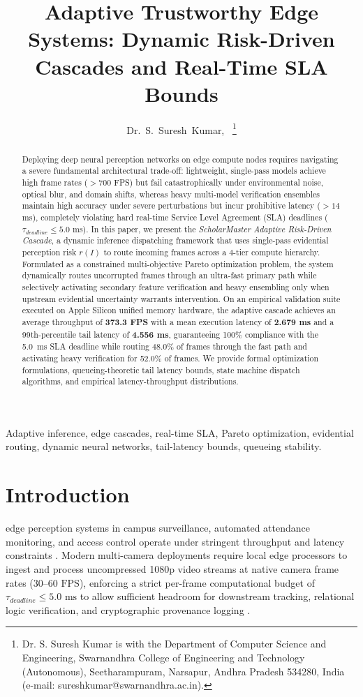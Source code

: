 \documentclass[10pt,journal,compsoc]{IEEEtran}
\title{Adaptive Trustworthy Edge Systems: Dynamic Risk-Driven Cascades and Real-Time SLA Bounds}
\author{Dr.~S.~Suresh~Kumar\IEEEauthorrefmark{1},~\IEEEmembership{Senior Member,~IEEE}
\thanks{\IEEEauthorrefmark{1}Dr. S. Suresh Kumar is with the Department of Computer Science and Engineering, Swarnandhra College of Engineering and Technology (Autonomous), Seetharampuram, Narsapur, Andhra Pradesh 534280, India (e-mail: sureshkumar@swarnandhra.ac.in).}}
\begin{document}
\maketitle

\begin{abstract}
Deploying deep neural perception networks on edge compute nodes requires navigating a severe fundamental architectural trade-off: lightweight, single-pass models achieve high frame rates ($>700$ FPS) but fail catastrophically under environmental noise, optical blur, and domain shifts, whereas heavy multi-model verification ensembles maintain high accuracy under severe perturbations but incur prohibitive latency ($>14$ ms), completely violating hard real-time Service Level Agreement (SLA) deadlines ($\tau_{deadline} \le 5.0$ ms). In this paper, we present the \textit{ScholarMaster Adaptive Risk-Driven Cascade}, a dynamic inference dispatching framework that uses single-pass evidential perception risk $r(I)$ to route incoming frames across a 4-tier compute hierarchy. Formulated as a constrained multi-objective Pareto optimization problem, the system dynamically routes uncorrupted frames through an ultra-fast primary path while selectively activating secondary feature verification and heavy ensembling only when upstream evidential uncertainty warrants intervention. On an empirical validation suite executed on Apple Silicon unified memory hardware, the adaptive cascade achieves an average throughput of \textbf{373.3 FPS} with a mean execution latency of \textbf{2.679 ms} and a 99th-percentile tail latency of \textbf{4.556 ms}, guaranteeing 100\% compliance with the 5.0~ms SLA deadline while routing 48.0\% of frames through the fast path and activating heavy verification for 52.0\% of frames. We provide formal optimization formulations, queueing-theoretic tail latency bounds, state machine dispatch algorithms, and empirical latency-throughput distributions.
\end{abstract}

\begin{IEEEkeywords}
Adaptive inference, edge cascades, real-time SLA, Pareto optimization, evidential routing, dynamic neural networks, tail-latency bounds, queueing stability.
\end{IEEEkeywords}

\section{Introduction}
 edge perception systems in campus surveillance, automated attendance monitoring, and access control operate under stringent throughput and latency constraints \cite{shi2016edge, zhou2019edge}. Modern multi-camera deployments require local edge processors to ingest and process uncompressed 1080p video streams at native camera frame rates ($30\text{--}60\text{ FPS}$), enforcing a strict per-frame computational budget of $\tau_{deadline} \le 5.0\text{ ms}$ to allow sufficient headroom for downstream tracking, relational logic verification, and cryptographic provenance logging \cite{kumar2026scholar1, kumar2026scholar22}.
\end{document}
